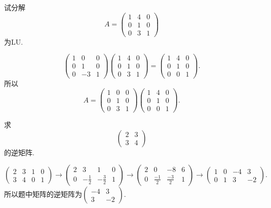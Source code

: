 ﻿\documentclass{book} \usepackage{exsheets} \usepackage{xeCJK}
\begin{document}
\begin{question}
  试分解
$$
A=
\begin{pmatrix}
  1&4&0\\
  0&1&0\\
  0&3&1
\end{pmatrix}
$$
为LU.
\end{question}
\begin{solution}
 $$ 
 \begin{pmatrix}
   1&0&0\\
   0&1&0\\
   0&-3&1
 \end{pmatrix}
 \begin{pmatrix}
   1&4&0\\
   0&1&0\\
   0&3&1
 \end{pmatrix}=
 \begin{pmatrix}
   1&4&0\\
   0&1&0\\
   0&0&1
 \end{pmatrix}.
 $$
 所以
$$
A=
\begin{pmatrix}
  1&0&0\\
  0&1&0\\
  0&3&1
\end{pmatrix}
\begin{pmatrix}
  1&4&0\\
  0&1&0\\
  0&0&1
\end{pmatrix}.
$$
\end{solution}
\begin{question}
  求
$$
\begin{pmatrix}
  2&3\\
  3&4
\end{pmatrix}
$$
的逆矩阵.
\end{question}
\begin{solution}
$$
  \begin{pmatrix}
    2&3&1&0\\
    3&4&0&1
  \end{pmatrix}\to
  \begin{pmatrix}
    2&3&1&0\\
    0&-\frac{1}{2}&-\frac{3}{2}&1
  \end{pmatrix}\to
  \begin{pmatrix}
    2&0&-8&6\\
    0&\frac{-1}{2}&\frac{-3}{2}&1
  \end{pmatrix}\to
  \begin{pmatrix}
    1&0&-4&3\\
    0&1&3&-2
  \end{pmatrix}.
$$
所以题中矩阵的逆矩阵为$
\begin{pmatrix}
  -4&3\\
  3&-2
\end{pmatrix}.  $
\end{solution}
\end{document}
